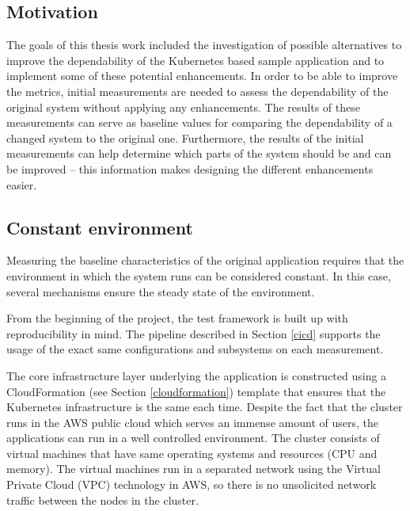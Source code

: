 \subsection{Motivation}

The goals of this thesis work included the investigation of possible alternatives to improve the dependability of the Kubernetes based sample application and to implement some of these potential enhancements. In order to be able to improve the metrics, initial measurements are needed to assess the dependability of the original system without applying any enhancements. The results of these measurements can serve as baseline values for comparing the dependability of a changed system to the original one. Furthermore, the results of the initial measurements can help determine which parts of the system should be and can be improved -- this information makes designing the different enhancements easier.

\subsection{Constant environment}

Measuring the baseline characteristics of the original application requires that the environment in which the system runs can be considered constant. In this case, several mechanisms ensure the steady state of the environment.

From the beginning of the project, the test framework is built up with reproducibility in mind. The pipeline described in Section \ref{cicd} supports the usage of the exact same configurations and subsystems on each measurement. 

The core infrastructure layer underlying the application is constructed using a CloudFormation (see Section \ref{cloudformation}) template that ensures that the Kubernetes infrastructure is the same each time. Despite the fact that the cluster runs in the AWS public cloud which serves an immense amount of users, the applications can run in a well controlled environment. The cluster consists of virtual machines that have same operating systems and resources (\eg CPU and memory). The virtual machines run in a separated network using the Virtual Private Cloud (VPC) technology in AWS, so there is no unsolicited network traffic between the nodes in the cluster.

